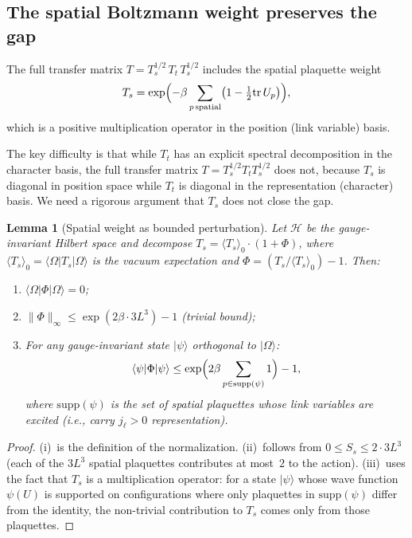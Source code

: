 \documentclass[11pt]{article}
\newtheorem{lemma}[theorem]{Lemma}
\theoremstyle{definition}
\newcommand{\tr}{\mathrm{tr}}
\begin{document}
\subsection{The spatial Boltzmann weight preserves the gap}

The full transfer matrix $T=T_s^{1/2}\,T_t\,T_s^{1/2}$ includes the
spatial plaquette weight
\begin{equation}
T_s=\exp\Bigl(-\beta\sum_{p\,\mathrm{spatial}}
\bigl(1-\tfrac{1}{2}\tr\,U_p\bigr)\Bigr),
\end{equation}
which is a positive multiplication operator in the position (link
variable) basis.

The key difficulty is that while $T_t$ has an explicit spectral
decomposition in the character basis, the full transfer matrix
$T=T_s^{1/2}T_tT_s^{1/2}$ does not, because $T_s$ is diagonal in
position space while $T_t$ is diagonal in the representation (character)
basis.  We need a rigorous argument that $T_s$ does not close the gap.

\begin{lemma}[Spatial weight as bounded perturbation]\label{lem:Ts-bound}
Let $\mathcal{H}$ be the gauge-invariant Hilbert space and decompose
$T_s=\langle T_s\rangle_0\cdot(1+\Phi)$, where $\langle T_s\rangle_0
=\langle\Omega|T_s|\Omega\rangle$ is the vacuum expectation and
$\Phi=(T_s/\langle T_s\rangle_0)-1$.  Then:
\begin{enumerate}[nosep,label=(\roman*)]
\item $\langle\Omega|\Phi|\Omega\rangle=0$;
\item $\|\Phi\|_\infty\le\exp(2\beta\cdot 3L^3)-1$ (trivial bound);
\item For any gauge-invariant state $|\psi\rangle$ orthogonal to
$|\Omega\rangle$:
\[
\langle\psi|\Phi|\psi\rangle
\le\exp\Bigl(2\beta\sum_{p\in\mathrm{supp}(\psi)}1\Bigr)-1,
\]
where $\mathrm{supp}(\psi)$ is the set of spatial plaquettes whose
link variables are excited (i.e., carry $j_\ell>0$ representation).
\end{enumerate}
\end{lemma}

\begin{proof}
(i)~is the definition of the normalization.  (ii)~follows from
$0\le S_s\le 2\cdot 3L^3$ (each of the $3L^3$ spatial plaquettes
contributes at most~$2$ to the action).  (iii)~uses the fact that
$T_s$ is a multiplication operator: for a state $|\psi\rangle$ whose
wave function $\psi(U)$ is supported on configurations where only
plaquettes in $\mathrm{supp}(\psi)$ differ from the identity, the
non-trivial contribution to $T_s$ comes only from those plaquettes.
\end{proof}
\end{document}
